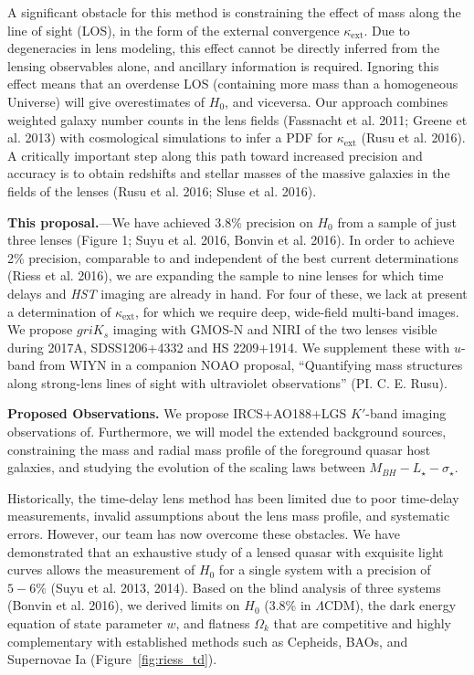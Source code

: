 \documentclass[a4paper,11pt]{article}
\begin{document}
A significant obstacle for this method is constraining the effect of mass along the line of sight (LOS), in the form of the external convergence $\kappa_\mathrm{ext}$. Due to degeneracies in lens modeling, this effect cannot be directly inferred from the lensing observables alone, and ancillary information is required. Ignoring this effect means that an overdense LOS (containing more mass than a homogeneous Universe) will give overestimates of $H_{0}$, and viceversa. Our approach combines weighted galaxy number counts in the lens fields (Fassnacht et al. 2011; Greene et al. 2013) with cosmological simulations to infer a PDF for $\kappa_\mathrm{ext}$ (Rusu et al. 2016). A critically important step along this path toward increased precision and accuracy is to obtain redshifts and stellar masses of the massive galaxies in the fields of the lenses (Rusu et al. 2016; Sluse et al. 2016).

{\bf This proposal.}---We have achieved 3.8\% precision on $H_{0}$ from a sample of just three lenses (Figure 1; Suyu et al. 2016, Bonvin et al. 2016). In order to achieve 2\% precision, comparable to and independent of the best current determinations (Riess et al. 2016), we are expanding the sample to nine lenses for which time delays and {\it HST} imaging are already in hand. For four of these, we lack at present a determination of $\kappa_\mathrm{ext}$, for which we require deep, wide-field multi-band images.
We propose $griK_s$ imaging with GMOS-N and NIRI of the two lenses visible during 2017A, SDSS1206+4332 and HS 2209+1914. We supplement these with $u$-band from WIYN in a companion NOAO proposal, ``Quantifying mass structures along strong-lens lines of sight with ultraviolet observations''  (PI. C. E. Rusu). 

{\bf Proposed Observations.} We propose IRCS+AO188+LGS $K'$-band imaging observations of. Furthermore, we will model the extended background sources, constraining the mass and radial mass profile of the foreground quasar host galaxies, and studying the evolution of the scaling laws between $M_{BH} - L_\star - \sigma_\star$.

Historically, the time-delay lens method has been limited due to poor time-delay measurements,
invalid assumptions about the lens mass profile, and systematic errors. 
However, our team has now overcome these obstacles.
We have demonstrated that an exhaustive study of a lensed quasar with
exquisite light curves allows the measurement of $H_{0}$ for a single system with a
precision of $5-6\%$ (Suyu et al. 2013, 2014).
Based on the blind analysis
of three systems (Bonvin et al. 2016), we derived limits on $H_{0}$ (3.8\% in $\Lambda$CDM), the dark energy equation of state
parameter $w$, and flatness $\Omega_{k}$ that are competitive and highly
complementary with established methods such as Cepheids, BAOs, and Supernovae Ia (Figure~\ref{fig:riess_td}).
\end{document}
